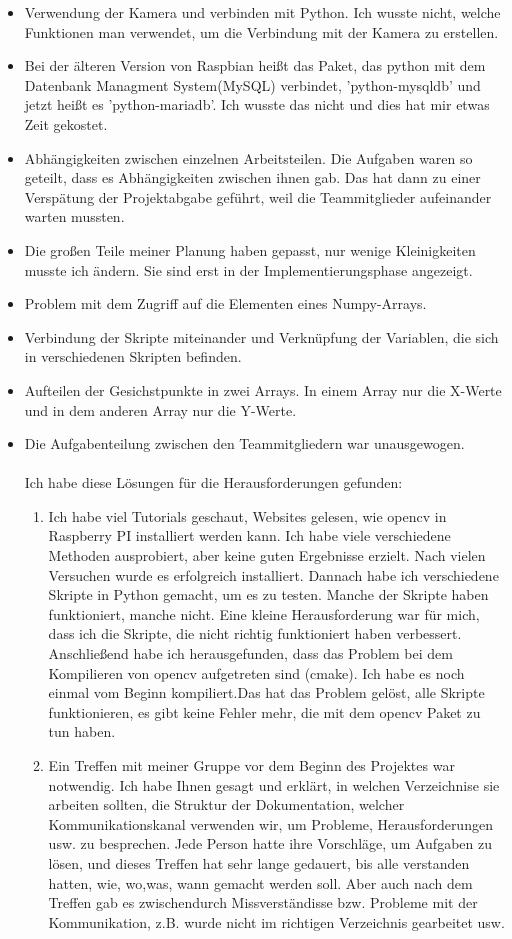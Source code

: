 \begin{itemize}
	\item Verwendung der Kamera und verbinden mit Python. Ich wusste nicht, welche Funktionen man verwendet, um die Verbindung mit der Kamera zu erstellen. 
	\item Bei der \"alteren Version von Raspbian hei{\ss}t das Paket, das python mit dem Datenbank Managment System(MySQL) verbindet, 'python-mysqldb' und jetzt hei{\ss}t es 'python-mariadb'. Ich wusste das nicht und dies hat mir etwas Zeit gekostet.
	\item Abh\"angigkeiten zwischen einzelnen Arbeitsteilen. Die Aufgaben waren so geteilt, dass es Abh\"angigkeiten zwischen ihnen gab. Das hat dann zu einer Versp\"atung der Projektabgabe gef\"uhrt, weil die Teammitglieder aufeinander warten mussten.
	\item Die gro{\ss}en Teile meiner Planung haben gepasst, nur wenige Kleinigkeiten musste ich \"andern. Sie sind erst in der Implementierungsphase angezeigt.
	\item Problem mit dem Zugriff auf die Elementen eines Numpy-Arrays.
	\item Verbindung der Skripte miteinander und Verkn\"upfung der Variablen, die sich in verschiedenen Skripten befinden.
	\item Aufteilen der Gesichstpunkte in zwei Arrays. In einem Array nur die X-Werte und in dem anderen Array nur die Y-Werte. 
	\item Die Aufgabenteilung zwischen den Teammitgliedern war unausgewogen. 
	\\
	\\
Ich habe diese L\"osungen f\"ur die Herausforderungen gefunden: 
\begin{enumerate}
	\item Ich habe viel Tutorials geschaut, Websites gelesen, wie opencv in Raspberry PI installiert werden kann. Ich habe viele verschiedene Methoden ausprobiert, aber keine guten Ergebnisse erzielt. Nach vielen Versuchen wurde es erfolgreich installiert. Dannach habe ich verschiedene Skripte in Python gemacht, um es zu testen. Manche der Skripte haben funktioniert, manche nicht. Eine kleine Herausforderung war f\"ur mich, dass ich die Skripte, die nicht richtig funktioniert haben verbessert. Anschlie{\ss}end habe ich herausgefunden, dass das Problem bei dem Kompilieren von opencv aufgetreten sind (cmake). Ich habe es noch einmal vom Beginn kompiliert.Das hat das Problem gel\"ost, alle Skripte funktionieren, es gibt keine Fehler mehr, die mit dem opencv Paket zu tun haben.
	
	\item Ein Treffen mit meiner Gruppe vor dem Beginn des Projektes war notwendig. Ich habe Ihnen gesagt und erkl\"art, in welchen Verzeichnise sie arbeiten sollten, die Struktur der Dokumentation, welcher Kommunikationskanal verwenden wir, um Probleme, Herausforderungen usw. zu besprechen. Jede Person hatte ihre Vorschl\"age, um Aufgaben zu l\"osen, und dieses Treffen hat sehr lange gedauert, bis alle verstanden hatten, wie, wo,was, wann gemacht werden soll. Aber auch nach dem Treffen gab es zwischendurch Missverst\"andisse bzw. Probleme mit der Kommunikation, z.B. wurde nicht im richtigen Verzeichnis gearbeitet usw. 
	

\end{enumerate}
\end{itemize}
